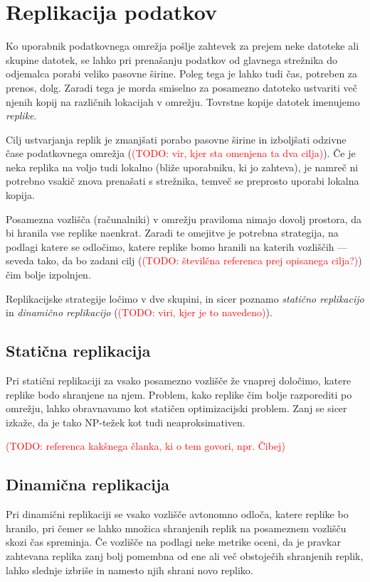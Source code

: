 \documentclass[a4paper, 12pt]{book}
\newcommand{\newterm}{\textit}
\newcommand{\TODO}[1]{\textcolor{red}{(TODO: #1)}}
\begin{document}
\section{Replikacija podatkov}

Ko uporabnik podatkovnega omrežja pošlje zahtevek za prejem neke datoteke
ali skupine datotek, se lahko pri prenašanju podatkov od glavnega strežnika
do odjemalca porabi veliko pasovne širine. Poleg tega je lahko tudi čas,
potreben za prenos, dolg. Zaradi tega je morda smiselno za posamezno
datoteko ustvariti več njenih kopij na različnih lokacijah v omrežju.
Tovrstne kopije datotek imenujemo \newterm{replike}.

Cilj ustvarjanja replik je zmanjšati porabo pasovne širine in izboljšati
odzivne čase podatkovnega omrežja (\TODO{vir, kjer sta omenjena ta dva
cilja}). Če je neka replika na voljo tudi lokalno (bliže
uporabniku, ki jo zahteva), je namreč ni potrebno vsakič znova prenašati s
strežnika, temveč se preprosto uporabi lokalna kopija.

Posamezna vozlišča (računalniki) v omrežju praviloma nimajo dovolj prostora,
da bi hranila vse replike naenkrat. Zaradi te omejitve je potrebna
strategija, na podlagi katere se odločimo, katere replike bomo hranili
na katerih vozliščih --- seveda tako, da bo zadani cilj (\TODO{številčna
referenca prej opisanega cilja?}) čim bolje izpolnjen.

Replikacijske strategije ločimo v dve skupini, in sicer poznamo
\newterm{statično replikacijo} in \newterm{dinamično replikacijo}
(\TODO{viri, kjer je to navedeno}).

\subsection{Statična replikacija}

Pri statični replikaciji za vsako posamezno vozlišče že vnaprej določimo,
katere replike bodo shranjene na njem. Problem, kako replike čim bolje
razporediti po omrežju, lahko obravnavamo kot statičen optimizacijski
problem. Zanj se sicer izkaže, da je tako NP-težek kot tudi
neaproksimativen.

\TODO{referenca kakšnega članka, ki o tem govori, npr. Čibej}

\subsection{Dinamična replikacija}

Pri dinamični replikaciji se vsako vozlišče avtonomno odloča, katere
replike bo hranilo, pri čemer se lahko množica shranjenih replik na
posameznem vozlišču skozi čas spreminja. Če vozlišče na podlagi neke
metrike oceni, da je pravkar zahtevana replika zanj bolj pomembna od ene
ali več obstoječih shranjenih replik, lahko slednje izbriše in namesto
njih shrani novo repliko.
\end{document}
